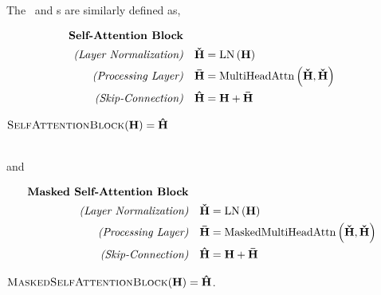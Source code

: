 \noindent   The \selfattentionblock~and \maskedselfattentionblock s are similarly defined as,\\
   {\centering \begin{minipage}{0.9\textwidth}
   \begin{align*}
       \textbf{Self-Attention Block} & \\
       \textit{(Layer Normalization)} & & 
            \boldsymbol{\check{\mathbf{H}}} &
            =  \operatorname{LN}\left(\mathbf{H}\right) \\
            \textit{(Processing Layer)} &  & \boldsymbol{\bar{\mathbf{H}}} &=  \operatorname{MultiHeadAttn}\left(\boldsymbol{\check{\mathbf{H}}}, \boldsymbol{\check{\mathbf{H}}}\right)  \\
        \textit{(Skip-Connection)} & & \boldsymbol{\hat{\mathbf{H}}} &= \mathbf{H} + \boldsymbol{\bar{\mathbf{H}}}\end{align*}
       \begin{center}  {$\textsc{SelfAttentionBlock}(\mathbf{H}) =  {\boldsymbol{\hat{\mathbf{H}}}}$}\end{center}
\end{minipage}}

~\\

         \noindent  and \\
   {\centering \begin{minipage}{0.9\textwidth}
         \begin{align*}
       \textbf{Masked Self-Attention Block} & \\
       \textit{(Layer Normalization)} & & 
            \boldsymbol{\check{\mathbf{H}}} &
            =  \operatorname{LN}\left(\mathbf{H}\right) \\
            \textit{(Processing Layer)} &  & \boldsymbol{\bar{\mathbf{H}}} &=  \operatorname{MaskedMultiHeadAttn}\left(\boldsymbol{\check{\mathbf{H}}}, \boldsymbol{\check{\mathbf{H}}}\right)  \\
        \textit{(Skip-Connection)} & & \boldsymbol{\hat{\mathbf{H}}} &= \mathbf{H} + \boldsymbol{\bar{\mathbf{H}}}\end{align*}
       \begin{center}  {$\textsc{MaskedSelfAttentionBlock}(\mathbf{H}) =  {\boldsymbol{\hat{\mathbf{H}}}}$.}\end{center}
\end{minipage}}

